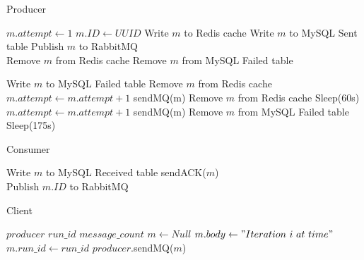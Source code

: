 \documentclass[12pt]{article}
\begin{document}
\begin{algorithm}
\caption{Producer}\label{alg:cap}
\begin{algorithmic}
\State $m.attempt \gets 1$
\EndIf
{}
\State $m.ID \gets UUID$
\EndIf
\State Write $m$ to Redis cache
\State Write $m$ to MySQL Sent table
\EndIf
\State Publish $m$ to RabbitMQ
\EndFunction\\
\State Remove $m$ from Redis cache
\EndIf
{}
\State Remove $m$ from MySQL Failed table
\EndIf
\EndFor
\EndWhile
\EndFunction\\
\end{algorithmic}
\end{algorithm}
\begin{algorithm}
\begin{algorithmic}
\State Write $m$ to MySQL Failed table
\State Remove $m$ from Redis cache
\Else
\State $m.attempt \gets m.attempt + 1$
\State sendMQ(m)
\State Remove $m$ from Redis cache
\EndIf
\State Sleep(60s)
\EndFor
\EndWhile
\EndFunction\\
\State $m.attempt \gets m.attempt + 1$
\State sendMQ(m)
\State Remove $m$ from MySQL Failed table
\State Sleep(175s)
\EndFor
\EndWhile
\EndFunction
\end{algorithmic}
\end{algorithm}

\begin{algorithm}
\caption{Consumer}\label{alg:cap}
\begin{algorithmic}
\State Write $m$ to MySQL Received table
\EndIf
\State sendACK($m$)
\EndFor
\EndWhile
\EndFunction\\
\State Publish $m.ID$ to RabbitMQ
\EndFunction
\end{algorithmic}
\end{algorithm}

\begin{algorithm}
\caption{Client}\label{alg:cap}
\begin{algorithmic}
\Require $producer$
\Require $run\_id$
\Require $message\_count$
\State $m \gets Null$
\State $m.body \gets "Iteration\ i\ at\ time"$
\State $m.run\_id \gets run\_id$
\State $producer$.sendMQ($m$)
\EndFor
\end{algorithmic}
\end{algorithm}
\end{document}
